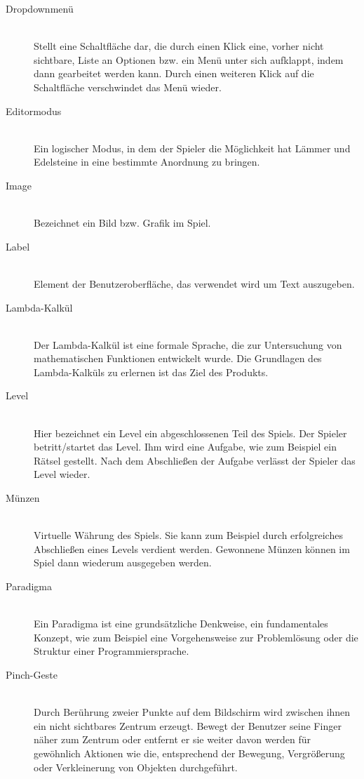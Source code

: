 \begin{description}
	\item[Dropdownmenü] \hfill \\
	Stellt eine Schaltfläche dar, die durch einen Klick eine, vorher nicht sichtbare, Liste an Optionen bzw.
	ein Menü unter sich aufklappt, indem dann gearbeitet werden kann. 
	Durch einen weiteren Klick auf die Schaltfläche verschwindet das Menü wieder.
	
	\item[Editormodus] \hfill \\
	Ein logischer Modus, in dem der Spieler die Möglichkeit hat Lämmer und Edelsteine in eine bestimmte Anordnung zu bringen.
	
	\item[Image] \hfill \\
	Bezeichnet ein Bild bzw. Grafik im Spiel.
	
	\item[Label] \hfill \\
	Element der Benutzeroberfläche, das verwendet wird um Text auszugeben. 
	
	\item[Lambda-Kalkül] \hfill \\
	Der Lambda-Kalkül ist eine formale Sprache, die zur Untersuchung von mathematischen Funktionen entwickelt wurde.
	Die Grundlagen des Lambda-Kalküls zu erlernen ist das Ziel des Produkts.
	
	\item[Level] \hfill \\
	Hier bezeichnet ein Level ein abgeschlossenen Teil des Spiels. Der Spieler betritt/startet das Level. Ihm wird eine Aufgabe,
	wie zum Beispiel ein Rätsel gestellt. Nach dem Abschließen der Aufgabe verlässt der Spieler das Level wieder.
	
	\item[Münzen] \hfill \\
	Virtuelle Währung des Spiels. Sie kann zum Beispiel durch erfolgreiches Abschließen eines Levels verdient werden.
	Gewonnene Münzen können im Spiel dann wiederum ausgegeben werden.
	
	\item[Paradigma] \hfill \\
	Ein Paradigma ist eine grundsätzliche Denkweise, ein fundamentales Konzept, wie zum Beispiel eine Vorgehensweise zur Problemlösung
	oder die Struktur einer Programmiersprache.
	
	\item[Pinch-Geste] \hfill \\
	Durch Berührung zweier Punkte auf dem Bildschirm wird zwischen ihnen ein nicht sichtbares Zentrum erzeugt.
	Bewegt der Benutzer seine Finger näher zum Zentrum oder entfernt er sie weiter davon werden für gewöhnlich
	Aktionen wie die, entsprechend der Bewegung, Vergrößerung oder Verkleinerung von Objekten durchgeführt.
	

\end{description}
